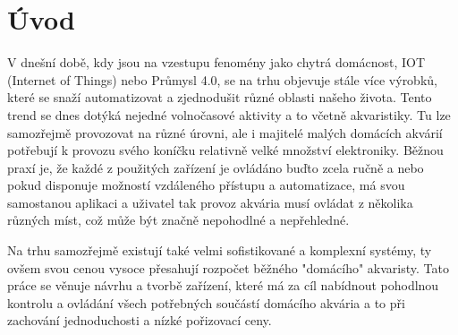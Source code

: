 \chapter*{Úvod}
{}


V dnešní době, kdy jsou na vzestupu fenomény jako chytrá domácnost, IOT (Internet of Things) nebo Průmysl 4.0, se na trhu objevuje stále více výrobků, které se snaží automatizovat a zjednodušit různé oblasti našeho života. Tento trend se dnes dotýká nejedné volnočasové aktivity a to včetně akvaristiky. Tu lze samozřejmě provozovat na různé úrovni, ale i majitelé malých domácích akvárií potřebují k provozu svého koníčku relativně velké množství elektroniky. 
Běžnou praxí je, že každé z použitých zařízení je ovládáno buďto zcela ručně a nebo pokud disponuje možností vzdáleného přístupu a automatizace, má svou samostanou aplikaci a uživatel tak provoz akvária musí ovládat z několika různých míst, což může být značně nepohodlné a nepřehledné.

Na trhu samozřejmě existují také velmi sofistikované a komplexní systémy, ty ovšem svou cenou vysoce přesahují rozpočet běžného "domácího" akvaristy. Tato práce se věnuje návrhu a tvorbě zařízení, které má za cíl nabídnout pohodlnou kontrolu a ovládání všech potřebných součástí domácího akvária a to při zachování jednoduchosti a nízké pořizovací ceny.